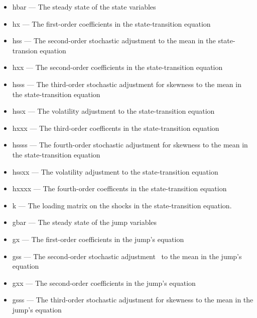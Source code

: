 \documentclass[notitlepage,11pt]{article}
\begin{document}
\begin{itemize}
\item hbar --- The steady state of the state variables

\item hx --- The first-order coefficients in the state-transition equation

\item hss --- The second-order stochastic adjustment to the mean in the
state-transion equation

\item hxx --- The second-order coefficients in the state-transition equation

\item hsss --- The third-order stochastic adjustment for skewness to the
mean in the state-transition equation

\item hssx --- The volatility adjustment to the state-transition equation

\item hxxx --- The third-order coefficents in the state-transition equation

\item hssss --- The fourth-order stochastic adjustment for skewness to the
mean in the state-transition equation

\item hssxx --- The volatility adjustment to the state-transition equation

\item hxxxx --- The fourth-order coefficents in the state-transition equation

\item k --- The loading matrix on the shocks in the state-transition
equation.

\item gbar --- The steady state of the jump variables

\item gx --- The first-order coefficients in the jump's equation

\item gss --- The second-order stochastic adjustment \ to the mean in the
jump's equation

\item gxx --- The second-order coefficients in the jump's equation

\item gsss --- The third-order stochastic adjustment for skewness to the
mean in the jump's equation


\end{itemize}
\end{document}
